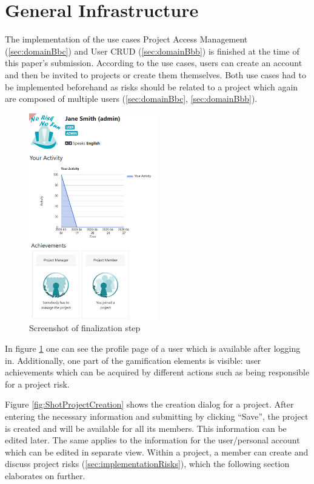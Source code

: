 \section{General Infrastructure}
\label{sec:implementationInfra}

The implementation of the use cases Project Access Management (\ref{sec:domainBbc}) and User CRUD (\ref{sec:domainBbb}) is finished at the time of this paper's submission. According to the use cases, users can create an account and then be invited to projects or create them themselves. Both use cases had to be implemented beforehand as risks should be related to a project which again are composed of multiple users (\ref{sec:domainBbc}, \ref{sec:domainBbb}).

\begin{figure}
	\includegraphics[width=0.5\textwidth]{Assets/implementation_shots/profile.png}
	\caption{Screenshot of finalization step}
	\label{fig:ShotProfile}
\end{figure}


In figure \ref{fig:ShotProfile} one can see the profile page of a user which is available after logging in. Additionally, one part of the gamification elements is visible: user achievements which can be acquired by different actions such as being responsible for a project risk.



Figure \ref{fig:ShotProjectCreation} shows the creation dialog for a project. After entering the necessary information and submitting by clicking “Save”, the project is created and will be available for all its members. This information can be edited later. The same applies to the information for the user/personal account which can be edited in separate view. Within a project, a member can create and discuss project risks (\ref{sec:implementationRisks}), which the following section elaborates on further.

